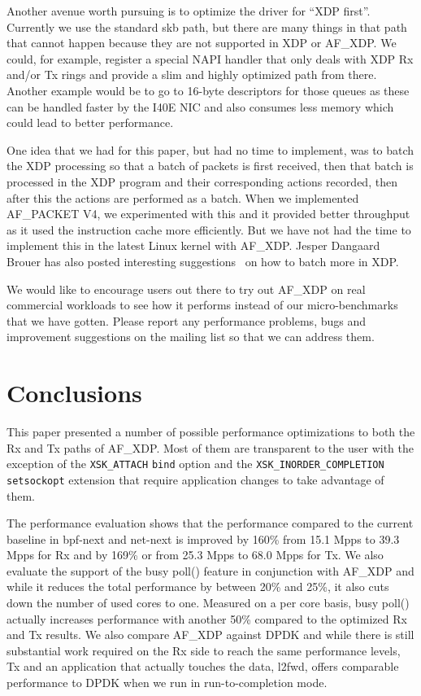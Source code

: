 \documentclass[9pt,numbers,reprint]{sigplanconf}
\begin{document}
Another avenue worth pursuing is to optimize the driver for ``XDP
first''. Currently we use the standard skb path, but there are many
things in that path that cannot happen because they are not supported
in XDP or AF\_XDP. We could, for example, register a special NAPI
handler that only deals with XDP Rx and/or Tx rings and provide a slim
and highly optimized path from there. Another example would be to go
to 16-byte descriptors for those queues as these can be handled faster
by the I40E NIC and also consumes less memory which could lead to
better performance.

One idea that we had for this paper, but had no time to implement, was
to batch the XDP processing so that a batch of packets is first
received, then that batch is processed in the XDP program and their
corresponding actions recorded, then after this the actions are
performed as a batch. When we implemented AF\_PACKET V4, we
experimented with this and it provided better throughput as it used
the instruction cache more efficiently. But we have not had the time
to implement this in the latest Linux kernel with AF\_XDP. Jesper
Dangaard Brouer has also posted interesting
suggestions~\cite{jesper_batching} on how to batch more in XDP.

We would like to encourage users out there to try out AF\_XDP on real
commercial workloads to see how it performs instead of our
micro-benchmarks that we have gotten. Please report any performance
problems, bugs and improvement suggestions on the mailing list so that
we can address them.


\section{Conclusions}
\label{sec:conclutions}

This paper presented a number of possible performance optimizations to
both the Rx and Tx paths of AF\_XDP. Most of them are transparent to
the user with the exception of the {\tt XSK\_ATTACH} {\tt bind} option
and the {\tt XSK\_INORDER\_COMPLETION} {\tt setsockopt} extension that
require application changes to take advantage of them.

The performance evaluation shows that the performance compared to the
current baseline in bpf-next and net-next is improved by 160\% from
15.1 Mpps to 39.3 Mpps for Rx and by 169\% or from 25.3 Mpps to 68.0
Mpps for Tx. We also evaluate the support of the busy poll() feature
in conjunction with AF\_XDP and while it reduces the total performance
by between 20\% and 25\%, it also cuts down the number of used cores
to one. Measured on a per core basis, busy poll() actually increases
performance with another 50\% compared to the optimized Rx and Tx
results. We also compare AF\_XDP against DPDK and while there is still
substantial work required on the Rx side to reach the same performance
levels, Tx and an application that actually touches the data, l2fwd,
offers comparable performance to DPDK when we run in run-to-completion
mode.
\end{document}
